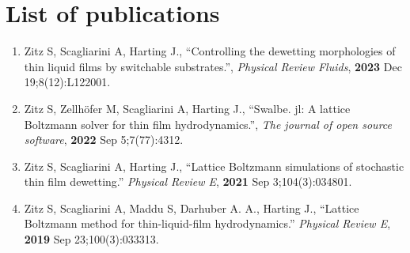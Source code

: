 \chapter{List of publications}
\label{chapter:lop}

\begin{enumerate}
    \item Zitz S, Scagliarini A, Harting J., ``Controlling the dewetting morphologies of thin liquid films by switchable substrates.'', \textit{Physical Review Fluids}, \textbf{2023} Dec 19;8(12):L122001.
    \item Zitz S, Zellhöfer M, Scagliarini A, Harting J., ``Swalbe. jl: A lattice Boltzmann solver for thin film hydrodynamics.'', \textit{The journal of open source software},  \textbf{2022} Sep 5;7(77):4312.
    \item Zitz S, Scagliarini A, Harting J., ``Lattice Boltzmann simulations of stochastic thin film dewetting.'' \textit{Physical Review E}, \textbf{2021} Sep 3;104(3):034801.
    \item Zitz S, Scagliarini A, Maddu S, Darhuber A. A., Harting J., ``Lattice Boltzmann method for thin-liquid-film hydrodynamics.'' \textit{Physical Review E}, \textbf{2019} Sep 23;100(3):033313.
\end{enumerate}